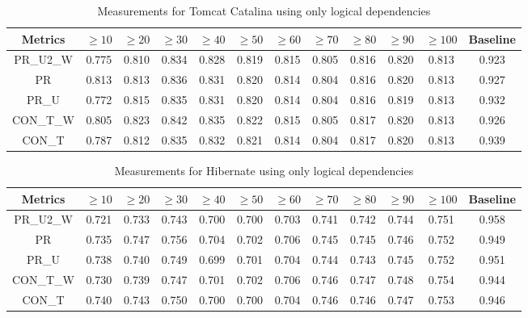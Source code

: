 \documentclass[runningheads]{comsis2}
\begin{document}
\begin{table}[!h]
\setlength\tabcolsep{3.5pt}
\caption{Measurements for Tomcat Catalina using only logical dependencies}
\label{tab:measurementshistory:tomcat}
\centering
\begin{tabular}{|c|cccccccccc|c|}
\hline
Metrics &	$\geq10$	&	$\geq20$		&	$\geq30$		&	$\geq40$		&	$\geq50$		&	$\geq60$		&	$\geq70$		&	$\geq80$		&	$\geq90$		&	$\geq100$		&	Baseline \\
\hline

PR\_U2\_W	&	0.775	&	0.810	&	0.834	&	0.828	&	0.819	&	0.815	&	0.805	&	0.816	&	0.820	&	0.813	&	0.923	\\
PR	&	0.813	&	0.813	&	0.836	&	0.831	&	0.820	&	0.814	&	0.804	&	0.816	&	0.820	&	0.813	&	0.927	\\
PR\_U	&	0.772	&	0.815	&	0.835	&	0.831	&	0.820	&	0.814	&	0.804	&	0.816	&	0.819	&	0.813	&	0.932	\\
CON\_T\_W	&	0.805	&	0.823	&	0.842	&	0.835	&	0.822	&	0.815	&	0.805	&	0.817	&	0.820	&	0.813	&	0.926	\\
CON\_T	&	0.787	&	0.812	&	0.835	&	0.832	&	0.821	&	0.814	&	0.804	&	0.817	&	0.820	&	0.813	&	0.939	\\

				
\hline
\end{tabular}

\end{table}

\begin{table}[!h]
\setlength\tabcolsep{3.5pt}
\caption{Measurements for Hibernate using only logical dependencies}
\label{tab:measurementshistory:hibernate}
\centering
\begin{tabular}{|c|cccccccccc|c|}
\hline
Metrics &	$\geq10$	&	$\geq20$		&	$\geq30$		&	$\geq40$		&	$\geq50$		&	$\geq60$		&	$\geq70$		&	$\geq80$		&	$\geq90$		&	$\geq100$		&	Baseline \\
\hline

PR\_U2\_W	&	0.721	&	0.733	&	0.743	&	0.700	&	0.700	&	0.703	&	0.741	&	0.742	&	0.744	&	0.751	&	0.958	\\
PR	&	0.735	&	0.747	&	0.756	&	0.704	&	0.702	&	0.706	&	0.745	&	0.745	&	0.746	&	0.752	&	0.949	\\
PR\_U	&	0.738	&	0.740	&	0.749	&	0.699	&	0.701	&	0.704	&	0.744	&	0.743	&	0.745	&	0.752	&	0.951	\\
CON\_T\_W	&	0.730	&	0.739	&	0.747	&	0.701	&	0.702	&	0.706	&	0.746	&	0.747	&	0.748	&	0.754	&	0.944	\\
CON\_T	&	0.740	&	0.743	&	0.750	&	0.700	&	0.700	&	0.704	&	0.746	&	0.746	&	0.747	&	0.753	&	0.946	\\


\hline
\end{tabular}
\end{table}
\end{document}
